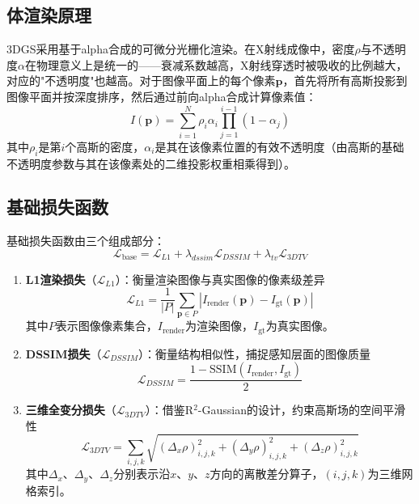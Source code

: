 \subsection{体渲染原理}

3DGS采用基于alpha合成的可微分光栅化渲染\cite{image-order}。在X射线成像中，密度$\rho$与不透明度$\alpha$在物理意义上是统一的——衰减系数越高，X射线穿透时被吸收的比例越大，对应的"不透明度"也越高。对于图像平面上的每个像素$\mathbf{p}$，首先将所有高斯投影到图像平面并按深度排序，然后通过前向alpha合成计算像素值：
\begin{equation}
I(\mathbf{p}) = \sum_{i=1}^{N} \rho_i \alpha_i \prod_{j=1}^{i-1}(1-\alpha_j)
\end{equation}
其中$\rho_i$是第$i$个高斯的密度，$\alpha_i$是其在该像素位置的有效不透明度（由高斯的基础不透明度参数与其在该像素处的二维投影权重相乘得到）。

\subsection{基础损失函数}

基础损失函数由三个组成部分：
\begin{equation}
\mathcal{L}_{\text{base}} = \mathcal{L}_{L1} + \lambda_{dssim} \mathcal{L}_{DSSIM} + \lambda_{tv} \mathcal{L}_{3DTV}
\end{equation}

\begin{enumerate}
    \item \textbf{L1渲染损失}（$\mathcal{L}_{L1}$）：衡量渲染图像与真实图像的像素级差异
    \begin{equation}
    \mathcal{L}_{L1} = \frac{1}{|P|} \sum_{\mathbf{p} \in P} |I_{\text{render}}(\mathbf{p}) - I_{\text{gt}}(\mathbf{p})|
    \end{equation}
    其中$P$表示图像像素集合，$I_{\text{render}}$为渲染图像，$I_{\text{gt}}$为真实图像。

    \item \textbf{DSSIM损失}（$\mathcal{L}_{DSSIM}$）：衡量结构相似性\cite{wang2004image}，捕捉感知层面的图像质量
    \begin{equation}
    \mathcal{L}_{DSSIM} = \frac{1 - \text{SSIM}(I_{\text{render}}, I_{\text{gt}})}{2}
    \end{equation}

    \item \textbf{三维全变分损失}（$\mathcal{L}_{3DTV}$）：借鉴R$^2$-Gaussian\cite{r2gaussian}的设计，约束高斯场的空间平滑性
    \begin{equation}
    \mathcal{L}_{3DTV} = \sum_{i,j,k} \sqrt{(\Delta_x \rho)_{i,j,k}^2 + (\Delta_y \rho)_{i,j,k}^2 + (\Delta_z \rho)_{i,j,k}^2}
    \end{equation}
    其中$\Delta_x$、$\Delta_y$、$\Delta_z$分别表示沿$x$、$y$、$z$方向的离散差分算子，$(i,j,k)$为三维网格索引。
\end{enumerate}

